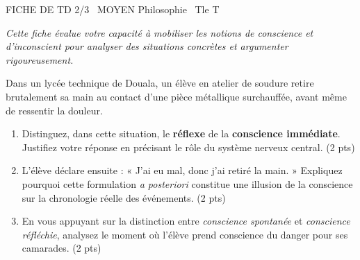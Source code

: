 \documentclass[11pt]{article}
\begin{document}
\begin{tcolorbox}[enhanced,colback=popink,colframe=popink,arc=10pt,boxrule=0pt,left=12pt,right=12pt,top=9pt,bottom=9pt]
{\color{white}\popxbold\small FICHE DE TD 2/3 \textbullet\ MOYEN \hfill Philosophie \textbullet\ Tle T\par}
\end{tcolorbox}
\vspace{4pt}
\noindent \textit{Cette fiche évalue votre capacité à mobiliser les notions de conscience et d'inconscient pour analyser des situations concrètes et argumenter rigoureusement.}

\begin{exercice}
Dans un lycée technique de Douala, un élève en atelier de soudure retire brutalement sa main au contact d'une pièce métallique surchauffée, avant même de ressentir la douleur.
\begin{enumerate}
    \item Distinguez, dans cette situation, le \textbf{réflexe} de la \textbf{conscience immédiate}. Justifiez votre réponse en précisant le rôle du système nerveux central. (2 pts)
    \item L'élève déclare ensuite : « J'ai eu mal, donc j'ai retiré la main. » Expliquez pourquoi cette formulation \textit{a posteriori} constitue une illusion de la conscience sur la chronologie réelle des événements. (2 pts)
    \item En vous appuyant sur la distinction entre \textit{conscience spontanée} et \textit{conscience réfléchie}, analysez le moment où l'élève prend conscience du danger pour ses camarades. (2 pts)
\end{enumerate}
\end{exercice}
\end{document}
